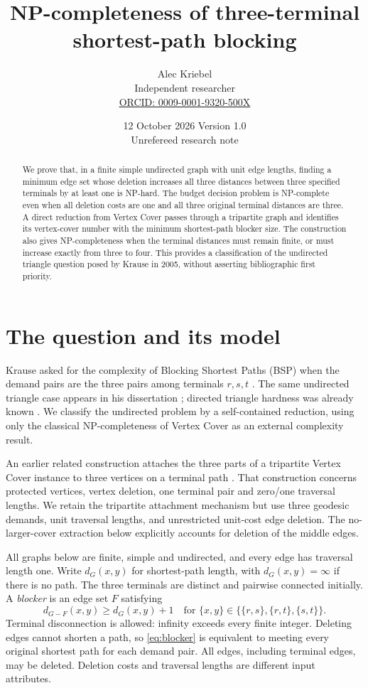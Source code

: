 \documentclass[11pt]{article}
\title{NP-completeness of three-terminal\\shortest-path blocking}
\author{Alec Kriebel\\\small Independent researcher\\\small\href{https://orcid.org/0009-0001-9320-500X}{ORCID: 0009-0001-9320-500X}}
\date{12 October 2026 \quad Version 1.0\\\small Unrefereed research note}
\begin{document}
\maketitle
\begin{abstract}
We prove that, in a finite simple undirected graph with unit edge lengths,
finding a minimum edge set whose deletion increases all three distances between
three specified terminals by at least one is NP-hard. The budget decision problem
is NP-complete even when all deletion costs are one and all three original
terminal distances are three. A direct reduction from Vertex Cover passes through
a tripartite graph and identifies its vertex-cover number with the minimum
shortest-path blocker size. The construction also gives NP-completeness when
the terminal distances must remain finite, or must increase exactly from three
to four. This provides a classification of the undirected triangle question
posed by Krause in 2005, without asserting bibliographic first priority.
\end{abstract}

\section{The question and its model}
Krause asked for the complexity of Blocking Shortest Paths (BSP) when the demand
pairs are the three pairs among terminals $r,s,t$ \cite[pp.~2856--2858]{krauseOWR}.
The same undirected triangle case appears in his dissertation
\cite[Section~4.3]{krauseThesis}; directed triangle hardness was already known
\cite[Theorem~9.3]{krauseThesis}. We classify the undirected problem by a
self-contained reduction, using only the classical NP-completeness of Vertex
Cover \cite{karp} as an external complexity result.

An earlier related construction attaches the three parts of a tripartite
Vertex Cover instance to three vertices on a terminal path
\cite[Section~6]{khachiyan}. That construction concerns protected vertices,
vertex deletion, one terminal pair and zero/one traversal lengths. We retain
the tripartite attachment mechanism but use three geodesic demands, unit
traversal lengths, and unrestricted unit-cost edge deletion. The no-larger-cover
extraction below explicitly accounts for deletion of the middle edges.

All graphs below are finite, simple and undirected, and every edge has traversal
length one. Write $d_G(x,y)$ for shortest-path length, with $d_G(x,y)=\infty$ if
there is no path. The three terminals are distinct and pairwise connected
initially. A \emph{blocker} is an edge set $F$ satisfying
\begin{equation}\label{eq:blocker}
d_{G-F}(x,y)\ge d_G(x,y)+1
\quad\text{for }\{x,y\}\in\{\{r,s\},\{r,t\},\{s,t\}\}.
\end{equation}
Terminal disconnection is allowed: infinity exceeds every finite integer.
Deleting edges cannot shorten a path, so \eqref{eq:blocker} is equivalent to
meeting every original shortest path for each demand pair. All edges, including
terminal edges, may be deleted. Deletion costs and traversal lengths are
different input attributes.
\end{document}
